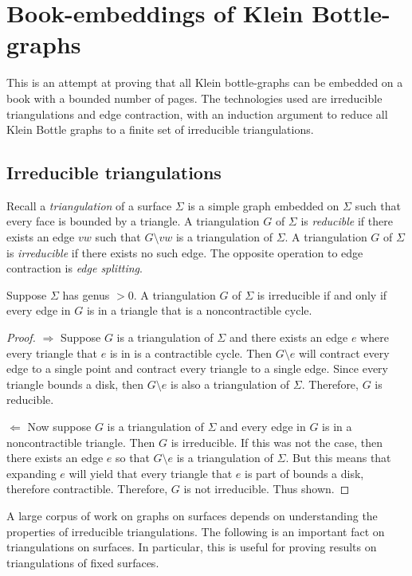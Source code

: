 \section{Book-embeddings of Klein Bottle-graphs}
This is an attempt at proving that all Klein bottle-graphs can be embedded on a book with a bounded number of pages. The technologies used are irreducible triangulations and edge contraction, with an induction argument to reduce all Klein Bottle graphs to a finite set of irreducible triangulations.

\subsection{Irreducible triangulations}
Recall a \textit{triangulation} of a surface $\Sigma$ is a simple graph embedded on $\Sigma$ such that every face is bounded by a triangle. A triangulation $G$ of $\Sigma$ is \textit{reducible} if there exists an edge $vw$ such that $G \setminus vw$ is a triangulation of $\Sigma$. A triangulation $G$ of $\Sigma$ is \textit{irreducible} if there exists no such edge. The opposite operation to edge contraction is \textit{edge splitting}. 

\begin{proposition}
    Suppose $\Sigma$ has genus $> 0$. A triangulation $G$ of $\Sigma$ is irreducible if and only if every edge in $G$ is in a triangle that is a noncontractible cycle.
\end{proposition}

\begin{proof}
    $\Rightarrow$ Suppose $G$ is a triangulation of $\Sigma$ and there exists an edge $e$ where every triangle that $e$ is in is a contractible cycle. Then $G \setminus e$ will contract every edge to a single point and contract every triangle to a single edge. Since every triangle bounds a disk, then $G \setminus e$ is also a triangulation of $\Sigma$. Therefore, $G$ is reducible. 

    $\Leftarrow$ Now suppose $G$ is a triangulation of $\Sigma$ and every edge in $G$ is in a noncontractible triangle. Then $G$ is irreducible. If this was not the case, then there exists an edge $e$ so that $G \setminus e$ is a triangulation of $\Sigma$. But this means that expanding $e$ will yield that every triangle that $e$ is part of bounds a disk, therefore contractible. Therefore, $G$ is not irreducible. Thus shown. 
\end{proof}

A large corpus of work on graphs on surfaces depends on understanding the properties of irreducible triangulations. The following is an important fact on triangulations on surfaces. In particular, this is useful for proving results on triangulations of fixed surfaces. 

